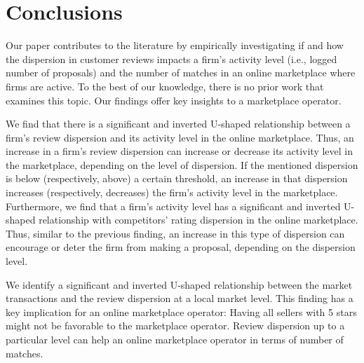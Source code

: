 \documentclass[mnsc,blindrev]{informs3}
\begin{document}
	
	
	
	
	
	
	
\section{Conclusions}

Our paper contributes to the literature by empirically investigating if and how the dispersion in customer reviews impacts a firm's activity level (i.e., logged number of proposals) and the number of matches in an online marketplace where firms are active. To the best of our knowledge, there is no prior work that examines this topic. Our findings offer key insights to a marketplace operator.

We find that there is a significant and inverted U-shaped relationship between a firm's review dispersion and its activity level in the online marketplace. Thus, an increase in a firm's review dispersion can increase or decrease its activity level in the marketplace, depending on the level of dispersion. If the mentioned dispersion is below (respectively, above) a certain threshold, an increase in that dispersion increases (respectively, decreases) the firm's activity level in the marketplace. Furthermore, we find that a firm's activity level  has a significant and inverted U-shaped relationship with competitors' rating dispersion in the online marketplace. Thus, similar to the previous finding, an increase in this type of dispersion can encourage or deter the firm from making a proposal, depending on the dispersion level.

We identify a significant and inverted U-shaped relationship between the market transactions and the review dispersion at a local market level. This finding has a key implication for an online marketplace operator: Having all sellers with 5 stars might not be favorable to the marketplace operator. Review dispersion up to a particular level can help an online marketplace operator in terms of number of matches.
\end{document}
